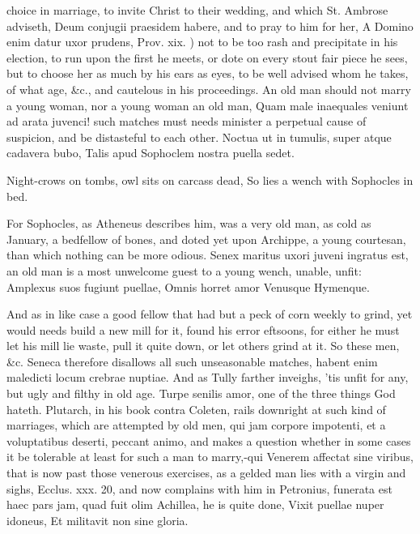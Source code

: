 {choice in marriage, to invite Christ to their wedding, and which
St. Ambrose adviseth, Deum conjugii praesidem habere, and to pray
to him for her, A Domino enim datur uxor prudens, Prov. xix. ) not to
be too rash and precipitate in his election, to run upon the first he
meets, or dote on every stout fair piece he sees, but to choose her as
much by his ears as eyes, to be well advised whom he takes, of what
age, \&c., and cautelous in his proceedings. An old man should not marry
a young woman, nor a young woman an old man,  Quam male
inaequales veniunt ad arata juvenci! such matches must needs minister a
perpetual cause of suspicion, and be distasteful to each other.
Noctua ut in tumulis, super atque cadavera bubo,
Talis apud Sophoclem nostra puella sedet.

Night-crows on tombs, owl sits on carcass dead,
So lies a wench with Sophocles in bed.

For Sophocles, as Atheneus describes him, was a very old man, as
cold as January, a bedfellow of bones, and doted yet upon Archippe, a
young courtesan, than which nothing can be more odious. Senex
maritus uxori juveni ingratus est, an old man is a most unwelcome guest
to a young wench, unable, unfit:
Amplexus suos fugiunt puellae,
Omnis horret amor Venusque Hymenque.

And as in like case a good fellow that had but a peck of corn weekly to
grind, yet would needs build a new mill for it, found his error
eftsoons, for either he must let his mill lie waste, pull it quite
down, or let others grind at it. So these men, \&c.
Seneca therefore disallows all such unseasonable matches, habent enim
maledicti locum crebrae nuptiae. And as Tully farther inveighs,
'tis unfit for any, but ugly and filthy in old age. Turpe senilis amor,
one of the three things God hateth. Plutarch, in his book contra
Coleten, rails downright at such kind of marriages, which are attempted
by old men, qui jam corpore impotenti, et a voluptatibus deserti,
peccant animo, and makes a question whether in some cases it be
tolerable at least for such a man to marry,-qui Venerem affectat sine
viribus, that is now past those venerous exercises, as a gelded man
lies with a virgin and sighs, Ecclus. xxx. 20, and now complains with
him in Petronius, funerata est haec pars jam, quad fuit olim Achillea,
he is quite done,
Vixit puellae nuper idoneus,
Et militavit non sine gloria.

}

